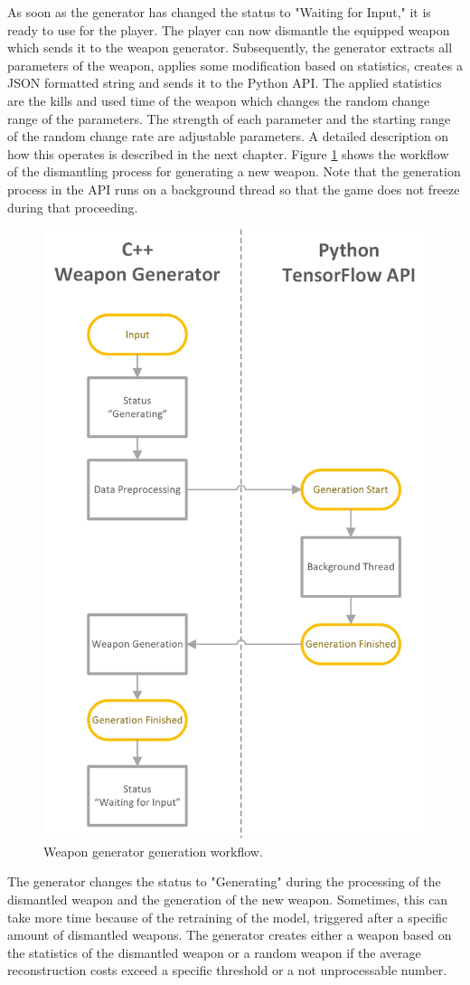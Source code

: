 \documentclass[MGS,Master,english]{twbook}%
\begin{document}
As soon as the generator has changed the status to "Waiting for Input," it is ready to use for the player. The player can now dismantle the equipped weapon which sends it to the weapon generator. Subsequently, the generator extracts all parameters of the weapon, applies some modification based on statistics, creates a \ac{JSON} formatted string and sends it to the Python \ac{API}. The applied statistics are the kills and used time of the weapon which changes the random change range of the parameters. The strength of each parameter and the starting range of the random change rate are adjustable parameters. A detailed description on how this operates is described in the next chapter. Figure \ref{figure::weaponGen::gen} shows the workflow of the dismantling process for generating a new weapon. Note that the generation process in the \ac{API} runs on a background thread so that the game does not freeze during that proceeding.
\begin{figure}[!ht]
	\centering
	\includegraphics[width=0.5\linewidth]{PICs/WeaponGeneratorWorkflow_Generation}
	\caption{Weapon generator generation workflow.} \label{figure::weaponGen::gen}
\end{figure}

The generator changes the status to "Generating" during the processing of the dismantled weapon and the generation of the new weapon. Sometimes, this can take more time because of the retraining of the model, triggered after a specific amount of dismantled weapons. The generator creates either a weapon based on the statistics of the dismantled weapon or a random weapon if the average reconstruction costs exceed a specific threshold or a not unprocessable number.
\end{document}
